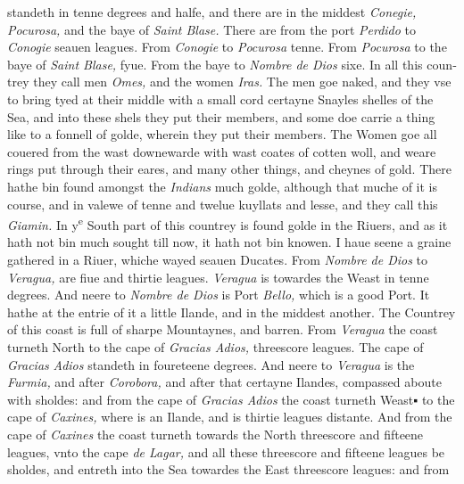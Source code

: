 \documentclass[11pt,twoside]{article}\makeatletter
\def\gap{}
\begin{document}
 standeth in tenne degrees and halfe, and there are in the mid­dest {\itshape Conegie, Pocurosa,} and the baye of {\itshape Saint Blase.} There are from the port {\itshape Perdido} to {\itshape Conogie} seauen leagues. From {\itshape Cono­gie} to {\itshape Pocurosa} tenne. From {\itshape Pocurosa} to the baye of {\itshape Saint Blase,} fyue. From the baye to {\itshape Nombre de Dios} sixe. In all this coun­trey 
	\normalmarginpar
       they call men {\itshape Omes,} and the women {\itshape Iras.} The men goe naked, and they vse to bring tyed at their middle with a small cord certayne Snayles shelles of the Sea, and into these shels they put their members, and some doe carrie a thing like to a fonnell of golde, wherein they put their members. The Wo­men goe all couered from the wast downewarde with wast coates of cotten woll, and weare rings put through their eares, and many other things, and cheynes of gold. There hathe bin found amongst the {\itshape Indians} much golde, although that muche of it is course, and in valewe of tenne and twelue kuyllats and lesse, and they call this {\itshape Giamin.} In y\textsuperscript{e} South part of this coun­trey is found golde in the Riuers, and as it hath not bin much sought till now, it hath not bin knowen. I haue seene a graine gathered in a Riuer, whiche wayed seauen Ducates. From {\itshape Nombre de Dios} to {\itshape Veragua,} are fiue and thirtie leagues. {\itshape Vera­gua} is 
	\normalmarginpar
       towardes the Weast in tenne degrees. And neere to {\itshape Nombre de Dios} is Port {\itshape Bello,} which is a good Port. It hathe at the entrie of it a little Ilande, and in the middest another. The Countrey of this coast is full of sharpe Mountaynes, and barren. From {\itshape Veragua} the coast turneth North to the cape of {\itshape Gracias Adios,} threescore leagues. The cape of {\itshape Gracias} 
	\normalmarginpar
       {\itshape Adios} standeth in foureteene degrees. And neere to {\itshape Veragua} is the {\itshape Furmia,} and after {\itshape Corobora,} and after that certayne I­landes, compassed aboute with sholdes: and from the cape of {\itshape Gracias Adios} the coast turneth Weast▪ to the cape of {\itshape Caxi­nes,} where is an Ilande, and is thirtie leagues distante. And from the cape of {\itshape Caxines} the coast turneth towards the North threescore and fifteene leagues, vnto the cape {\itshape de Lagar,} and all these threescore and fifteene leagues be sholdes, and entreth in­to 
	\normalmarginpar
      \marginnote{Sholde[...] {\gap •}.} the Sea towardes the East threescore leagues: and from %
\end{document}
